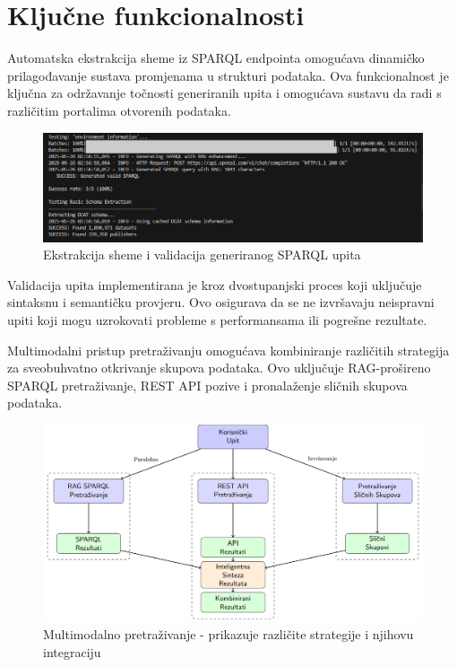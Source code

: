 \section{Ključne funkcionalnosti}

Automatska ekstrakcija sheme iz SPARQL endpointa omogućava dinamičko prilagođavanje sustava promjenama u strukturi podataka. Ova funkcionalnost je ključna za održavanje točnosti generiranih upita i omogućava sustavu da radi s različitim portalima otvorenih podataka.

\begin{figure}[htbp]
    \centering
    \includegraphics[width=1\textwidth]{figures/izvjestaj_image_11.png}
    \caption{Ekstrakcija sheme i validacija generiranog SPARQL upita}
    \label{fig:schema_extraction}
\end{figure}

Validacija upita implementirana je kroz dvostupanjski proces koji uključuje sintaksnu i semantičku provjeru. Ovo osigurava da se ne izvršavaju neispravni upiti koji mogu uzrokovati probleme s performansama ili pogrešne rezultate.

Multimodalni pristup pretraživanju omogućava kombiniranje različitih strategija za sveobuhvatno otkrivanje skupova podataka. Ovo uključuje RAG-prošireno SPARQL pretraživanje, REST API pozive i pronalaženje sličnih skupova podataka.

\begin{figure}[htbp]
    \centering
    \includegraphics[width=1\textwidth]{figures/multimodal_search.png}
    \caption{Multimodalno pretraživanje - prikazuje različite strategije i njihovu integraciju}
    \label{fig:multimodal_search}
\end{figure}

